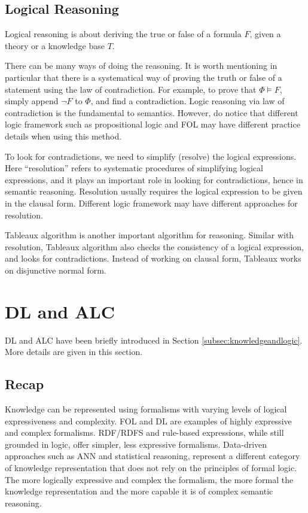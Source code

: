 \subsection{Logical Reasoning}

Logical reasoning is about deriving the true or false of a formula $F$, given a theory or a knowledge base $T$.

There can be many ways of doing the reasoning. It is worth mentioning in particular that there is a systematical way of proving the truth or false of a statement using the law of contradiction. For example, to prove that $\Phi \vDash F$, simply append $\neg F$ to $\Phi$, and find a contradiction. Logic reasoning via law of contradiction is the fundamental to semantics. However, do notice that different logic framework such as propositional logic and FOL may have different practice details when using this method.

To look for contradictions, we need to simplify (resolve) the logical expressions. Here ``resolution'' refers to systematic procedures of simplifying logical expressions, and it plays an important role in looking for contradictions, hence in semantic reasoning. Resolution usually requires the logical expression to be given in the clausal form. Different logic framework may have different approaches for resolution.

Tableaux algorithm is another important algorithm for reasoning. Similar with resolution, Tableaux algorithm also checks the consistency of a logical expression, and looks for contradictions. Instead of working on clausal form, Tableaux works on disjunctive normal form.

\section{DL and ALC} \label{sec:dlalc}

DL and ALC have been briefly introduced in Section \ref{subsec:knowledgeandlogic}. More details are given in this section.

\subsection{Recap}

Knowledge can be represented using formalisms with varying levels of logical expressiveness and complexity. FOL and DL are examples of highly expressive and complex formalisms. RDF/RDFS and rule-based expressions, while still grounded in logic, offer simpler, less expressive formalisms. Data-driven approaches such as ANN and statistical reasoning, represent a different category of knowledge representation that does not rely on the principles of formal logic. The more logically expressive and complex the formalism, the more formal the knowledge representation and the more capable it is of complex semantic reasoning.

